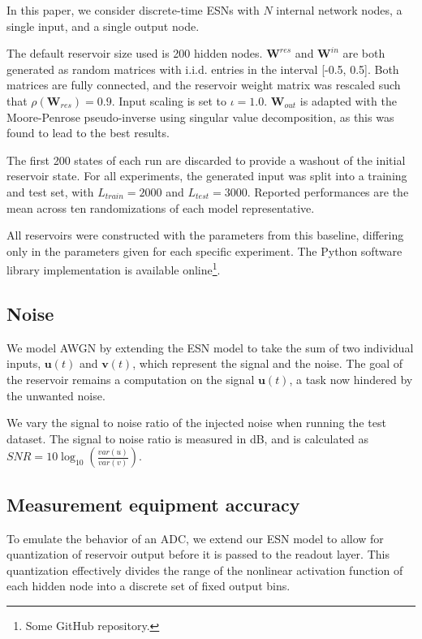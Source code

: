 In this paper, we consider discrete-time ESNs with $N$ internal network nodes, a
single input, and a single output node.

The default reservoir size used is 200 hidden nodes. $\mathbf{W}^{res}$ and
$\mathbf{W}^{in}$ are both generated as random matrices with i.i.d. entries in
the interval [-0.5, 0.5]. Both matrices are fully connected, and the reservoir
weight matrix was rescaled such that $\rho(\mathbf{W}_{res}) = 0.9$.  Input
scaling is set to $\iota = 1.0$. $\mathbf{W}_{out}$ is adapted with the
Moore-Penrose pseudo-inverse using singular value decomposition, as this was
found to lead to the best results.

The first 200 states of each run are discarded to provide a washout of the
initial reservoir state. For all experiments, the generated input was split into
a training and test set, with $L_{train} = 2000$ and $L_{test} = 3000$. Reported
performances are the mean across ten randomizations of each model
representative.

All reservoirs were constructed with the parameters from this baseline,
differing only in the parameters given for each specific experiment. The Python
software library implementation is available online\footnote{Some GitHub
repository.}.

\subsection{Noise}

We model AWGN by extending the ESN model to take the sum of two individual
inputs, $\mathbf{u}(t)$ and $\mathbf{v}(t)$, which represent the signal and the
noise. The goal of the reservoir remains a computation on the signal
$\mathbf{u}(t)$, a task now hindered by the unwanted noise.

We vary the signal to noise ratio of the injected noise when running the test
dataset. The signal to noise ratio is measured in dB, and is calculated as $SNR
= 10\log_{10}(\frac{var(u)}{var(v)})$.

\subsection{Measurement equipment accuracy}

To emulate the behavior of an ADC, we extend our ESN model to allow for
quantization of reservoir output before it is passed to the readout layer. This
quantization effectively divides the range of the nonlinear activation function
of each hidden node into a discrete set of fixed output bins.


